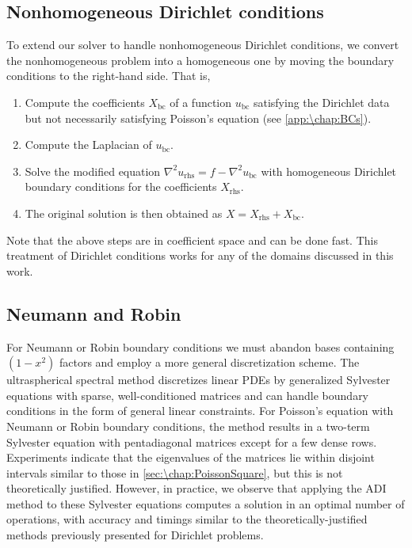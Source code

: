 \subsection{Nonhomogeneous Dirichlet conditions}
To extend our solver to handle nonhomogeneous Dirichlet conditions, we convert the nonhomogeneous problem into a homogeneous one by moving the boundary conditions to the right-hand side. That is,
\vspace{1em}
\begin{enumerate}[leftmargin=*]
\item Compute the coefficients $X_{\text{bc}}$ of a function $u_{\text{bc}}$ satisfying the Dirichlet data but not necessarily satisfying Poisson's equation (see \cref{app:\chap:BCs}).
\item Compute the Laplacian of $u_{\text{bc}}$.
\item Solve the modified equation $\nabla^2 u_{\text{rhs}} = f - \nabla^2 u_{\text{bc}}$ with homogeneous Dirichlet boundary conditions for the coefficients $X_{\text{rhs}}$.
\item The original solution is then obtained as $X = X_{\text{rhs}} + X_{\text{bc}}$.
\end{enumerate}
\vspace{1em}
Note that the above steps are in coefficient space and can be done fast. This treatment of Dirichlet conditions works for any of the domains discussed in this work.

\subsection{Neumann and Robin}
For Neumann or Robin boundary conditions we must abandon bases containing $(1-x^2)$ factors and employ a more general discretization scheme.  The ultraspherical spectral method \cite{Olver_13_01_inf, Townsend_15_01} discretizes linear PDEs by generalized Sylvester equations with sparse, well-conditioned matrices and can handle boundary conditions in the form of general linear constraints. For Poisson's equation with Neumann or Robin boundary conditions, the method results in a two-term Sylvester equation with pentadiagonal matrices except for a few dense rows. Experiments indicate that the eigenvalues of the matrices lie within disjoint intervals similar to those in \cref{sec:\chap:PoissonSquare}, but this is not theoretically justified. However, in practice, we observe that applying the ADI method to these Sylvester equations computes a solution in an optimal number of operations, with accuracy and timings similar to the theoretically-justified methods previously presented for Dirichlet problems.

